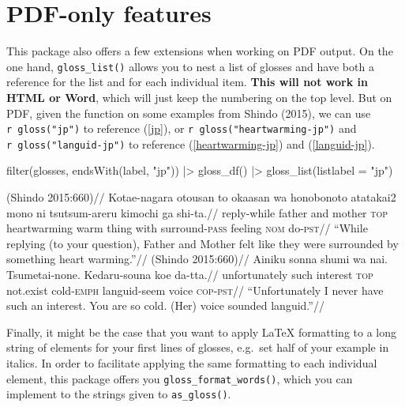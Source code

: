 \documentclass[
  letterpaper,
  DIV=11,
  numbers=noendperiod]{scrartcl}
\newenvironment{Shaded}{\begin{snugshade}}{\end{snugshade}}
\newcommand{\AttributeTok}[1]{\textcolor[rgb]{0.40,0.45,0.13}{#1}}
\newcommand{\FunctionTok}[1]{\textcolor[rgb]{0.28,0.35,0.67}{#1}}
\newcommand{\NormalTok}[1]{\textcolor[rgb]{0.00,0.23,0.31}{#1}}
\newcommand{\SpecialCharTok}[1]{\textcolor[rgb]{0.37,0.37,0.37}{#1}}
\newcommand{\StringTok}[1]{\textcolor[rgb]{0.13,0.47,0.30}{#1}}
\begin{document}
\section{PDF-only features}\label{pdf-only-features}

This package also offers a few extensions when working on PDF output. On
the one hand, \texttt{gloss\_list()} allows you to nest a list of
glosses and have both a reference for the list and for each individual
item. \textbf{This will not work in HTML or Word}, which will just keep
the numbering on the top level. But on PDF, given the function on some
examples from Shindo (2015), we can use
\texttt{\textasciigrave{}r\ gloss("jp")\textasciigrave{}} to reference
(\ref{jp}), or
\texttt{\textasciigrave{}r\ gloss("heartwarming-jp")\textasciigrave{}}
and \texttt{\textasciigrave{}r\ gloss("languid-jp")\textasciigrave{}} to
reference (\ref{heartwarming-jp}) and (\ref{languid-jp}).

\begin{Shaded}
\begin{Highlighting}[]
\FunctionTok{filter}\NormalTok{(glosses, }\FunctionTok{endsWith}\NormalTok{(label, }\StringTok{"jp"}\NormalTok{)) }\SpecialCharTok{|\textgreater{}} 
  \FunctionTok{gloss\_df}\NormalTok{() }\SpecialCharTok{|\textgreater{}} 
  \FunctionTok{gloss\_list}\NormalTok{(}\AttributeTok{listlabel =} \StringTok{"jp"}\NormalTok{)}
\end{Highlighting}
\end{Shaded}

\pex\label{jp}
\a\label{heartwarming-jp} \begingl \glpreamble (Shindo 2015:660)//
\gla Kotae-nagara otousan to okaasan wa honobonoto atatakai2 mono ni
tsutsum-areru kimochi ga shi-ta.// \glb reply-while father and mother
\textsc{top} heartwarming warm thing with surround-\textsc{pass} feeling
\textsc{nom} do-\textsc{pst}// \glft ``While replying (to your
question), Father and Mother felt like they were surrounded by something
heart warming.''// \endgl  \a\label{languid-jp}
\begingl \glpreamble (Shindo 2015:660)// \gla Ainiku sonna shumi wa nai.
Tsumetai-none. Kedaru-souna koe da-tta.// \glb unfortunately such
interest \textsc{top} not.exist cold-\textsc{emph} languid-seem voice
\textsc{cop-pst}// \glft ``Unfortunately I never have such an interest.
You are so cold. (Her) voice sounded languid.''// \endgl  \xe 

Finally, it might be the case that you want to apply LaTeX formatting to
a long string of elements for your first lines of glosses, e.g.~set half
of your example in italics. In order to facilitate applying the same
formatting to each individual element, this package offers you
\texttt{gloss\_format\_words()}, which you can implement to the strings
given to \texttt{as\_gloss()}.
\end{document}

